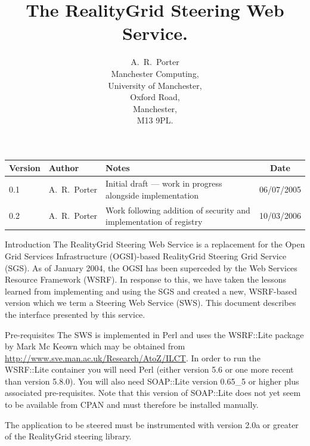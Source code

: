 \documentclass[a4paper]{article}
\begin{document}
\title{The RealityGrid Steering Web Service.}

\author{A.~R.~Porter \\
Manchester Computing,\\University of Manchester,\\Oxford Road,\\
Manchester,\\M13 9PL.}


\maketitle

\begin{table}
\begin{center}
\begin{tabular}{l|l|p{5cm}|c}
\hline\hline
Version & Author & Notes & Date \\
\hline
0.1 & A.~R.~Porter & Initial draft --- work in progress alongside implementation & 06/07/2005\\
0.2 & A.~R.~Porter & Work following addition of security and implementation of registry & 10/03/2006\\
\hline\hline
\end{tabular}
\end{center}
\end{table}

\pagebreak

\tableofcontents

\pagebreak

\begin{section}{Introduction}
The RealityGrid Steering Web Service is a replacement for the Open
Grid Services Infrastructure (OGSI)-based RealityGrid Steering Grid
Service (SGS).  As of January 2004, the OGSI has been superceded by
the Web Services Resource Framework (WSRF).  In response to this, we
have taken the lessons learned from implementing and using the SGS and
created a new, WSRF-based version which we term a Steering Web Service
(SWS).  This document describes the interface presented by this
service.
\end{section}


\begin{section}{Pre-requisites}
The SWS is implemented in Perl and uses the WSRF::Lite package by Mark
Mc Keown which may be obtained from
\url{http://www.sve.man.ac.uk/Research/AtoZ/ILCT}.  In order to run
the WSRF::Lite container you will need Perl (either version 5.6 or
one more recent than version 5.8.0).  You will also need SOAP::Lite version
0.65\_5 or higher plus associated pre-requisites.  Note that this
version of SOAP::Lite does not yet seem to be available from CPAN and
must therefore be installed manually.

The application to be steered must be instrumented with version 2.0a or
greater of the RealityGrid steering library.
\end{section}
\end{document}

